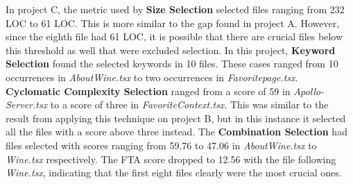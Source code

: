 \begin{figure}[H]
\label{fig:Cresults}
\end{figure} \hfill 

In project C, the metric used by \textbf{Size Selection} selected files ranging from 232 LOC to 61 LOC. This is more similar to the gap found in project A. However, since the eighth file had 61 LOC, it is possible that there are crucial files below this threshold as well that were excluded selection.
In this project, \textbf{Keyword Selection} found the selected keywords in 10 files. These cases ranged from 10 occurrences in \textit{AboutWine.tsx} to two occurrences in \textit{Favoritepage.tsx}.
\textbf{Cyclomatic Complexity Selection} ranged from a score of 59 in \textit{Apollo-Server.tsx} to a score of three in \textit{FavoriteContext.tsx}. This was similar to the result from applying this technique on project B, but in this instance it selected all the files with a score above three instead.
The \textbf{Combination Selection} had files selected with scores ranging from 59.76 to 47.06 in \textit{AboutWine.tsx} to \textit{Wine.tsx} respectively. The FTA score dropped to 12.56 with the file following \textit{Wine.tsx}, indicating that the first eight files clearly were the most crucial ones. \\


